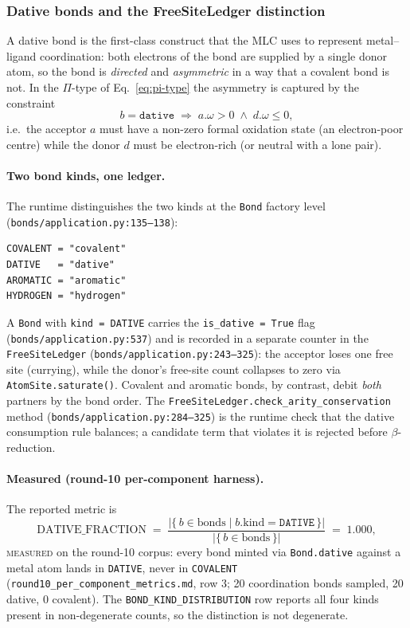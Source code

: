 \subsubsection{Dative bonds and the FreeSiteLedger distinction}
\label{sec:dative-bonds}

A dative bond is the first-class construct that the MLC uses to
represent metal--ligand coordination: both electrons of the bond
are supplied by a single donor atom, so the bond is \emph{directed}
and \emph{asymmetric} in a way that a covalent bond is not. In the
$\Pi$-type of Eq.~\eqref{eq:pi-type} the asymmetry is captured by
the constraint
\begin{equation}
  \label{eq:dative-asymmetry}
  b = \texttt{dative}
    \;\Longrightarrow\;
    a.\omega > 0 \;\wedge\; d.\omega \leq 0,
\end{equation}
i.e.\ the acceptor $a$ must have a non-zero formal oxidation state
(an electron-poor centre) while the donor $d$ must be
electron-rich (or neutral with a lone pair).

\paragraph{Two bond kinds, one ledger.}
The runtime distinguishes the two kinds at the
\texttt{Bond} factory level
(\texttt{bonds/application.py:135--138}):
\begin{verbatim}
COVALENT = "covalent"
DATIVE   = "dative"
AROMATIC = "aromatic"
HYDROGEN = "hydrogen"
\end{verbatim}
A \texttt{Bond} with \texttt{kind = DATIVE} carries the
\texttt{is\_dative = True} flag (\texttt{bonds/application.py:537})
and is recorded in a separate counter in the
\texttt{FreeSiteLedger} (\texttt{bonds/application.py:243--325}):
the acceptor loses one free site (currying), while the donor's
free-site count collapses to zero via
\texttt{AtomSite.saturate()}. Covalent and aromatic bonds, by
contrast, debit \emph{both} partners by the bond order. The
\texttt{FreeSiteLedger.check\_arity\_conservation} method
(\texttt{bonds/application.py:284--325}) is the runtime check
that the dative consumption rule balances; a candidate term that
violates it is rejected before $\beta$-reduction.

\paragraph{Measured (round-10 per-component harness).}
The reported metric is
\begin{equation}
  \label{eq:dative-fraction}
  \mathrm{DATIVE\_FRACTION}
    \;=\;
    \frac{
      \lvert\{\, b \in \mathrm{bonds}
             \mid b.\mathrm{kind} = \texttt{DATIVE} \,\}
    \rvert}{
      \lvert\{\, b \in \mathrm{bonds} \,\}\rvert
    }
    \;=\; 1.000,
\end{equation}
\textsc{measured} on the round-10 corpus: every bond minted via
\texttt{Bond.dative} against a metal atom lands in
\texttt{DATIVE}, never in \texttt{COVALENT}
(\texttt{round10\_per\_component\_metrics.md}, row 3; 20
coordination bonds sampled, 20 dative, 0 covalent). The
\texttt{BOND\_KIND\_DISTRIBUTION} row reports all four kinds
present in non-degenerate counts, so the distinction is not
degenerate.

